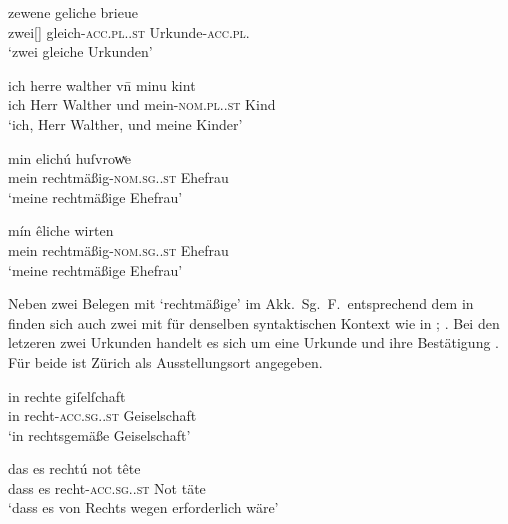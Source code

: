 \begin{exe}
\ex \label{ex:adjzuerregel}
	\begin{xlist}
	\ex \label{ex:adjzuerregel_1}
		\gll zewene geliche brieue \\
			zwei[\MascI] gleich-\textsc{acc.pl.\MascI.st}
				Urkunde-\textsc{acc.pl.\MascI} \\
		\trans `zwei gleiche Urkunden'
			\parencites(Nr.~2209, Zürich, 1295)[364,33]{cao3}

	\ex \label{ex:adjzuerregel_2}
		\gll ich herre walther vn̄ minu kint \\
			ich Herr Walther und mein-\textsc{nom.pl.\NeutX.st} Kind \\
		\trans `ich, Herr Walther, und meine Kinder'
			\parencites(Nr.~456, Hohenrain, Kt.~Luzern, 1281)[396,33--34]{cao1}
	\end{xlist}

\ex \label{ex:adjzueru}
	\begin{xlist}
	\ex \label{ex:adjzueru_1}
		\gll min elichú huſvrowͮe \\
			mein rechtmäßig-\textsc{nom.sg.\FemF.st} Ehefrau \\
		\trans `meine rechtmäßige Ehefrau'
			\parencites(Nr.~260, Hohenrain, Kt.~Luzern, 1276)[271,9]{cao1}

	\ex \label{ex:adjzueru_2}
		\gll mín êliche wirten \\
			mein rechtmäßig-\textsc{nom.sg.\FemF.st} Ehefrau \\
		\trans `meine rechtmäßige Ehefrau'
			\parencites(Nr.~1888, Hohenrain, Kt.~Luzern, 1294)[173,11]{cao3}
	\end{xlist}
\end{exe}

Neben zwei Belegen mit  `rechtmäßige' im Akk.~Sg.~F.\
entsprechend dem in \REF{ex:adjzuere_1} finden sich auch zwei mit \lit{rechtú}
für denselben syntaktischen Kontext wie in \REF{ex:adjzuere_3};
\citet[vgl. dazu][270--271]{ksw2}. Bei den letzeren zwei Urkunden handelt es
sich um eine Urkunde und ihre Bestätigung \autocite[375]{caor}. Für beide ist
Zürich als Ausstellungs\-ort angegeben.

\begin{exe}
\ex \label{ex:adjzuere}
	\begin{xlist}
	\ex \label{ex:adjzuere_1}
		\gll in rechte giſelſchaft \\
			in recht-\textsc{acc.sg.\FemI.st} Geiselschaft \\
		\trans `in rechtsgemäße Geiselschaft'
			\parencites(Nr.~35, Zürich, 1256 und Nr.~188, ebd., 1272)[66,31; 204,31]{cao1}

	\ex \label{ex:adjzuere_3}
		\gll das es rechtú not tête \\
			dass es recht-\textsc{acc.sg.\FemI.st} Not täte \\
		\trans `dass es von Rechts wegen erforderlich wäre'
			\parencites(Nr.~1591, Zürich, 1292 und Nr.~1756, ebd., 1292/93)[731,3]{cao2}[67,26--27]{cao3}
	\end{xlist}
\end{exe}

